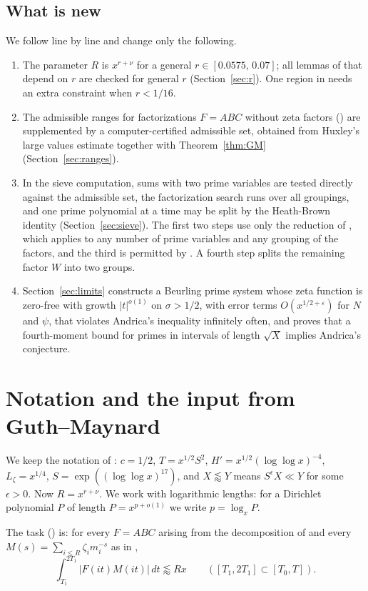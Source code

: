 \documentclass[11pt]{amsart}
\theoremstyle{definition}
\theoremstyle{remark}
\newcommand{\rz}{\RZERO}
\newcommand{\RZERO}{0.0575}
\newcommand{\all}{\lessapprox}
\newcommand{\J}{\cite{J}}
\begin{document}
\subsection*{What is new}
We follow \J{} line by line and change only the following.
\begin{enumerate}[(1)]
\item The parameter $R$ is $x^{r+\nu}$ for a general $r\in[\rz,\,0.07]$; all lemmas of \J{} that depend on $r$ are checked for general $r$ (Section~\ref{sec:r}). One region in \cite[Lemma~7.4]{J} needs an extra constraint when $r<1/16$.
\item The admissible ranges for factorizations $F=ABC$ without zeta factors (\cite[Proposition~6.1(i),(ii)]{J}) are supplemented by a computer-certified admissible set, obtained from Huxley's large values estimate together with Theorem~\ref{thm:GM} (Section~\ref{sec:ranges}).
\item In the sieve computation, sums with two prime variables are tested directly against the admissible set, the factorization search runs over all groupings, and one prime polynomial at a time may be split by the Heath-Brown identity (Section~\ref{sec:sieve}). The first two steps use only the reduction of \cite[Section~4]{J}, which applies to any number of prime variables and any grouping of the factors, and the third is permitted by \cite[Remark~4.10]{J}. A fourth step splits the remaining factor $W$ into two groups.
\item Section~\ref{sec:limits} constructs a Beurling prime system whose zeta function is zero-free with growth $|t|^{o(1)}$ on $\sigma>1/2$, with error terms $O(x^{1/2+\varepsilon})$ for $N$ and $\psi$, that violates Andrica's inequality infinitely often, and proves that a fourth-moment bound for primes in intervals of length $\sqrt X$ implies Andrica's conjecture.
\end{enumerate}

\section{Notation and the input from Guth--Maynard}

We keep the notation of \J{}: $c=1/2$, $T=x^{1/2}S^2$, $H'=x^{1/2}(\log\log x)^{-4}$, $L_\zeta=x^{1/4}$, $S=\exp((\log\log x)^{17})$, and $X\all Y$ means $S^{\epsilon}X\ll Y$ for some $\epsilon>0$. Now $R=x^{r+\nu}$. We work with logarithmic lengths: for a Dirichlet polynomial $P$ of length $P=x^{p+o(1)}$ we write $p=\log_x P$.

The task (\cite[Claim~5.1]{J}) is: for every $F=ABC$ arising from the decomposition of \cite[Information~4.15]{J} and every $M(s)=\sum_{i\le R}\zeta_i m_i^{-s}$ as in \cite[Proposition~2.1]{J},
\begin{equation}\label{eq:claim}
\int_{T_1}^{2T_1}|F(it)M(it)|\,dt\all Rx\qquad([T_1,2T_1]\subset[T_0,T]).
\end{equation}
\end{document}
